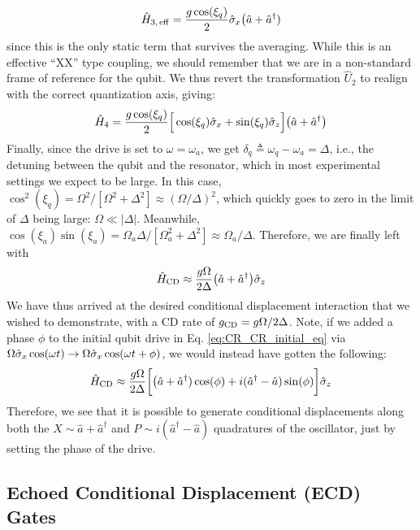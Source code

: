 \begin{equation}
\hat{H}_{3, \rm\, eff} = \frac{g\cos(\xi_q)}{2} \hat{\sigma}_x\big(\hat{a}+ \hat{a}^\dagger)
\end{equation}
since this is the only static term that survives the averaging. While this is an effective ``XX'' type coupling, we should remember that we are in a non-standard frame of reference for the qubit. We thus revert the transformation $\hat{U}_2$ to realign with the correct quantization axis, giving:
\begin{equation}
\hat{H}_4 =    \frac{g\cos(\xi_q)}{2} \Big[\cos(\xi_q)\hat{\sigma}_x +\sin(\xi_q)\hat{\sigma}_z\Big]\big(\hat{a}+\hat{a}^\dagger\big)
\end{equation}
Finally, since the drive is set to $\omega = \omega_a$, we get $\delta_q \triangleq \omega_q - \omega_a = \Delta$, i.e., the detuning between the qubit and the resonator, which in most experimental settings we expect to be large. In this case, $\cos^2(\xi_q)= \Omega^2 / [\Omega^2 + \Delta^2] \approx (\Omega/\Delta)^2$, which quickly goes to zero in the limit of $\Delta$ being large: $\Omega \ll |\Delta|$. Meanwhile, $\cos(\xi_a)\sin(\xi_a)= \Omega_a\Delta / [\Omega_a^2 + \Delta^2] \approx \Omega_a /\Delta$. Therefore, we are finally left with
\begin{equation}
\hat{H}_{\rm CD} \approx \frac{g\Omega }{2\Delta} \big(\hat{a}+\hat{a}^\dagger\big)\hat{\sigma}_z
\end{equation}
We have thus arrived at the desired conditional displacement interaction that we wished to demonstrate, with a CD rate of $g_{\rm CD} = g\Omega/2\Delta$. Note, if we added a phase $\phi$ to the initial qubit drive in Eq. \eqref{eq:CR_CR_initial_eq} via $\Omega\hat{\sigma}_x\cos(\omega t) \to \Omega\hat{\sigma}_x\cos(\omega t + \phi)$, we would instead have gotten the following:
\begin{equation}
\hat{H}_{\rm CD} \approx \frac{g\Omega }{2\Delta}\bigg[\big(\hat{a}+\hat{a}^\dagger)\cos(\phi) + i(\hat{a}^\dagger -\hat{a})\sin(\phi)\bigg]\hat{\sigma}_z 
\end{equation}
Therefore, we see that it is possible to generate conditional displacements along both the $X \sim \hat{a}+\hat{a}^\dagger$ and $P \sim i(\hat{a}^\dagger -\hat{a})$ quadratures of the oscillator, just by setting the phase of the drive.

\subsection{Echoed Conditional Displacement (ECD) Gates\label{sec:2_ECD}}

